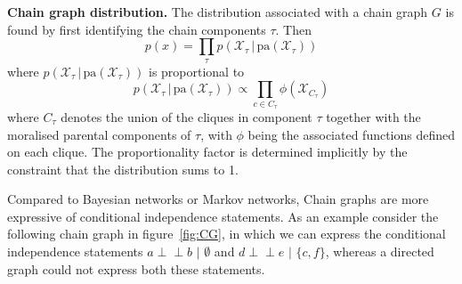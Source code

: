 \documentclass{article}
\newcommand{\indep}{\perp \!\!\! \perp}
\begin{document}
\begin{theorem}
    \textbf{Chain graph distribution.} The distribution associated with a chain graph $G$ is found by first identifying the chain components $\tau$. Then
    $$
        p(x) = \prod_{\tau} p(\mathcal{X}_\tau \,|\, \text{pa}(\mathcal{X}_\tau))
    $$
    where $p(\mathcal{X}_\tau \,|\, \text{pa}(\mathcal{X}_\tau))$ is proportional to
    $$
        p(\mathcal{X}_\tau \,|\, \text{pa}(\mathcal{X}_\tau)) \propto \prod_{c \in C_\tau} \phi(\mathcal{X}_{C_\tau})
    $$
    where $C_\tau$ denotes the union of the cliques in component $\tau$ together with the moralised parental components of $\tau$, with $\phi$ being the associated functions defined on each clique. The proportionality factor is determined implicitly by the constraint that the distribution sums to 1.  
\end{theorem}

\noindent Compared to Bayesian networks or Markov networks, Chain graphs are more expressive of conditional independence statements. As an example consider the following chain graph in figure~\ref{fig:CG}, in which we can express the conditional independence statements $a \indep b \,\,|\,\, \emptyset$ and $d \indep e \,\,|\,\, \{c, f\}$, whereas a directed graph could not express both these statements.
\end{document}
